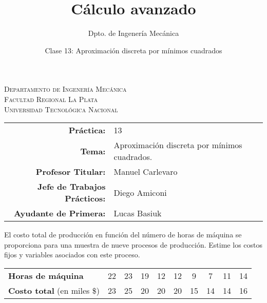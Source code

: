 \documentclass[11pt]{article}
\title{Cálculo avanzado}
\author{Dpto. de Ingenería Mecánica}
\date{Clase 13: Aproximación discreta por mínimos cuadrados}
\begin{document}

\begin{center}
\end{center} 

\begin{center}
\vspace{\baselineskip}
\Large{\textsc{Departamento de Ingenería Mecánica}} \\
\textsc{Facultad Regional La Plata} \\
\textsc{Universidad Tecnológica Nacional}
\end{center}


\begin{center}
\begin{tabular}{r l}
    \textbf{Práctica:} & 13 \\
 \textbf{Tema:} & Aproximación discreta por mínimos cuadrados. \\
 \textbf{Profesor Titular:} & Manuel Carlevaro \\
 \textbf{Jefe de Trabajos Prácticos:} & Diego Amiconi \\
 \textbf{Ayudante de Primera:} & Lucas Basiuk 
\end{tabular}\end{center}

\vspace{1em}

\begin{question} %
El costo total de producción en función del número de horas de máquina se proporciona para una muestra de nueve procesos de producción. Estime los costos fijos y variables asociados con este proceso.

\begin{center}
    \begin{tabular}{lccccccccc}
        \toprule
        \textbf{Horas de máquina} & 22 & 23 & 19 & 12 & 12 & 9 & 7 & 11 & 14 \\
        \textbf{Costo total} (en miles \$) & 23 & 25 & 20 & 20 & 20 & 15 & 14 & 14 & 16 \\
        \bottomrule
    \end{tabular}
\end{center}
\end{question}
\end{document}
